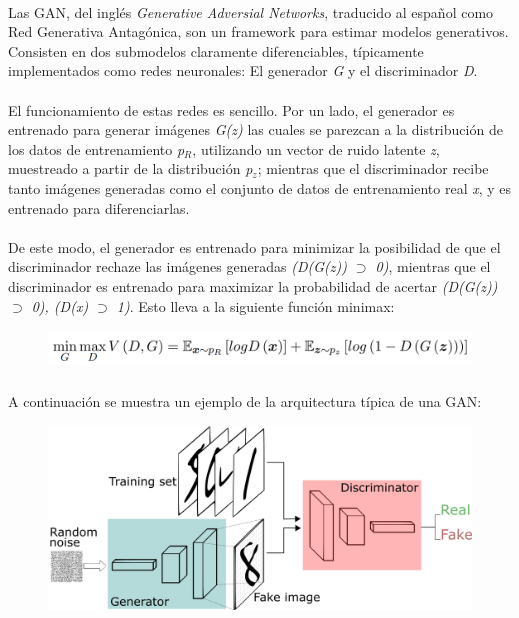 \documentclass[12pt]{article}
\begin{document}
	\paragraph{}
	Las GAN, del inglés \textit{Generative Adversial Networks}, traducido al español como Red Generativa Antagónica, son un framework para estimar modelos generativos. Consisten en dos submodelos claramente diferenciables, típicamente implementados como redes neuronales: El generador \textit{G} y el discriminador \textit{D}. 
	
	\paragraph{}
	El funcionamiento de estas redes es sencillo. Por un lado, el generador es entrenado para generar imágenes \textit{G(z)} las cuales se parezcan a la distribución de los datos de entrenamiento \textit{p$_{R}$}, utilizando un vector de ruido latente \textit{z}, muestreado a partir de la distribución \textit{p$_{z}$}; mientras que el discriminador recibe tanto imágenes generadas como el conjunto de datos de entrenamiento real \textit{x}, y es entrenado para diferenciarlas.
	
	\paragraph{}
	De este modo, el generador es entrenado para minimizar la posibilidad de que el discriminador rechaze las imágenes generadas \textit{(D(G(z)) $\supset$ 0)}, mientras que el discriminador es entrenado para maximizar la probabilidad de acertar \textit{(D(G(z)) $\supset$ 0), (D(x) $\supset$ 1)}. Esto lleva a la siguiente función minimax:
	
	\begin{figure}[H]
	 	\centering
		\includegraphics[height=1cm]{minimax.png}
		\label{fig:minimax}
	\end{figure}
	
	\paragraph{}
	A continuación se muestra un ejemplo de la arquitectura típica de una GAN:
	
	\begin{figure}[H]
	 	\centering
		\includegraphics[width=\linewidth]{gan.png}
		\label{fig:gan}
	\end{figure}	
	
\end{document}
